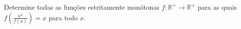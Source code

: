 Determine todas as funções estritamente monótonas \(f\colon  \mathbb{R}^+\to\mathbb{R}^+\) para as quais \(f\left(\frac{x^2}{f(x)}\right)=x\) para todo \(x\).
